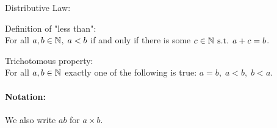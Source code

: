 \documentclass[MathsNotesBase.tex]{subfiles}
\begin{document}
{\begin{axiom}{Distributive Law:}
			\end{axiom}
			\begin{axiom}{Definition of "less than":}\\ For all $a,b \in \mathbb{N}^{},\; a < b$ if and only if there is some $c \in \mathbb{N}^{} \text{ s.t. } a + c = b$.
			\end{axiom}
			\begin{axiom}{Trichotomous property:}\\ For all $a,b \in \mathbb{N}^{}$ exactly one of the following is true: $a = b,\; a < b,\; b < a$.
			\end{axiom}
		}
		
		\paragraph{Notation:} We also write $ab$ for $a \times b$.
		
\end{document}
